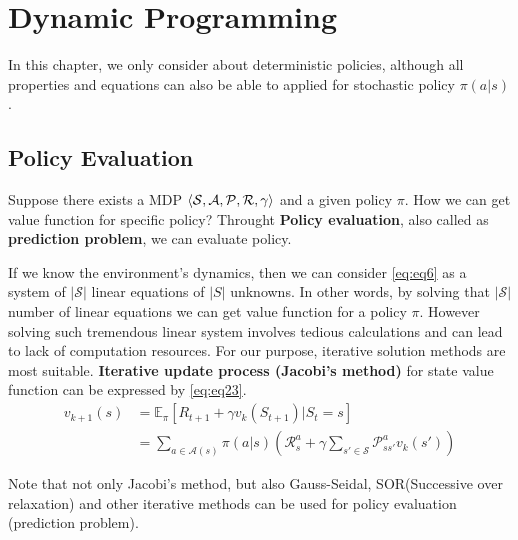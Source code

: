 \documentclass[
	10pt, %
]{article}
\newcommand{\mbb}[1]{\mathbb{#1}}
\newcommand{\mc}[1]{\mathcal{#1}}
\newcommand{\tb}[1]{\textbf{#1}}
\numberwithin{equation}{subsection} %
\begin{document}
\section{Dynamic Programming}
In this chapter, we only consider about deterministic policies, although all properties and equations can also be able to applied for stochastic policy $\pi(a|s)$.
\subsection{Policy Evaluation}
Suppose there exists a MDP $\braket{\mc{S,A,P,R}, \gamma}$ and a given policy $\pi$. How we can get value function for specific policy? Throught \tb{Policy evaluation}, also called as \tb{prediction problem}, we can evaluate policy.

If we know the environment's dynamics, then we can consider \cref{eq:eq6} as a system of $|\mc{S}|$ linear equations of $|S|$ unknowns. In other words, by solving that $|\mc{S}|$ number of linear equations we can get value function for a policy $\pi$. However solving such tremendous linear system involves tedious calculations and can lead to lack of computation resources. For our purpose, iterative solution methods are most suitable. \tb{Iterative update process (Jacobi's method)} for state value function can be expressed by \cref{eq:eq23}.
\begin{equation} \label{eq:eq23}
    \begin{aligned}
        v_{k+1}(s) &= \mbb{E}_\pi [R_{t+1} + \gamma v_k(S_{t+1}) | S_t = s] \\
        &= \sum_{a \in \mc{A}(s)} \pi(a|s)\left(\mc{R}^a_s + \gamma\sum_{s' \in \mc{S}}\mc{P}^a_{ss'}v_{k}(s') \right)
    \end{aligned}
\end{equation}

Note that not only Jacobi's method, but also Gauss-Seidal, SOR(Successive over relaxation) and other iterative methods can be used for policy evaluation (prediction problem).
\end{document}
